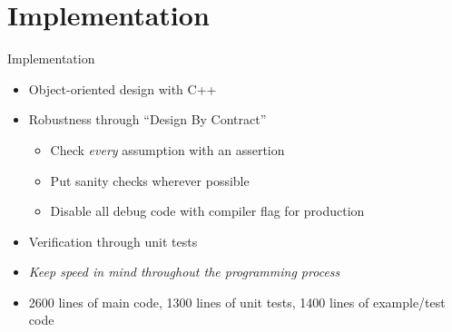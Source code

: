 \documentclass{beamer}
\begin{document}
\section{Implementation}
\begin{frame}{Implementation}
\begin{itemize}
  \item Object-oriented design with C++
  \item Robustness through ``Design By Contract''
    \begin{itemize}
      \item Check \emph{every} assumption with an assertion
      \item Put sanity checks wherever possible
      \item Disable all debug code with compiler flag for production
    \end{itemize}
  \item Verification through unit tests
  \item \emph{Keep speed in mind throughout the programming process}
  \item 2600 lines of main code, 1300 lines of unit tests, 1400 lines of
    example/test code
\end{itemize}
\end{frame}
\end{document}

